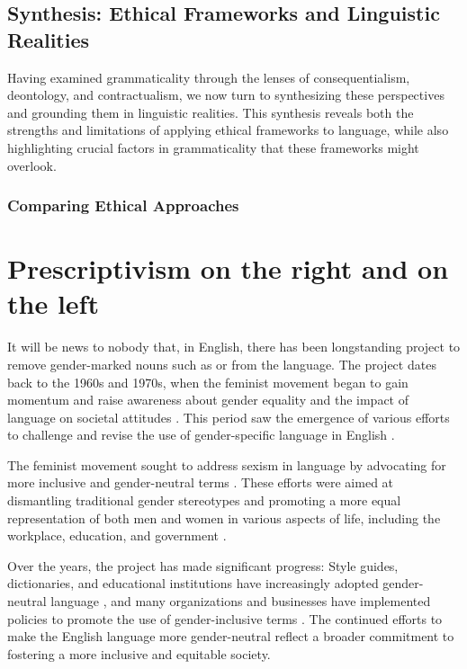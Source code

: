 \subsection{Synthesis: Ethical Frameworks and Linguistic Realities}

Having examined grammaticality through the lenses of consequentialism, deontology, and contractualism, we now turn to synthesizing these perspectives and grounding them in linguistic realities. This synthesis reveals both the strengths and limitations of applying ethical frameworks to language, while also highlighting crucial factors in grammaticality that these frameworks might overlook.

\subsubsection{Comparing Ethical Approaches}


\section{Prescriptivism on the right and on the left}

It will be news to nobody that, in English, there has been longstanding project to remove gender-marked nouns such as  or  from the language. The project dates back to the 1960s and 1970s, when the feminist movement began to gain momentum and raise awareness about gender equality and the impact of language on societal attitudes \citep{cameron1998}. This period saw the emergence of various efforts to challenge and revise the use of gender-specific language in English \citep{lakoff1973}.

The feminist movement sought to address sexism in language by advocating for more inclusive and gender-neutral terms \citep{miller1976}. These efforts were aimed at dismantling traditional gender stereotypes and promoting a more equal representation of both men and women in various aspects of life, including the workplace, education, and government \citep{spender1980}.

Over the years, the project has made significant progress: Style guides, dictionaries, and educational institutions have increasingly adopted gender-neutral language \citep{baron1986}, and many organizations and businesses have implemented policies to promote the use of gender-inclusive terms \citep{maggio1998}. The continued efforts to make the English language more gender-neutral reflect a broader commitment to fostering a more inclusive and equitable society.

